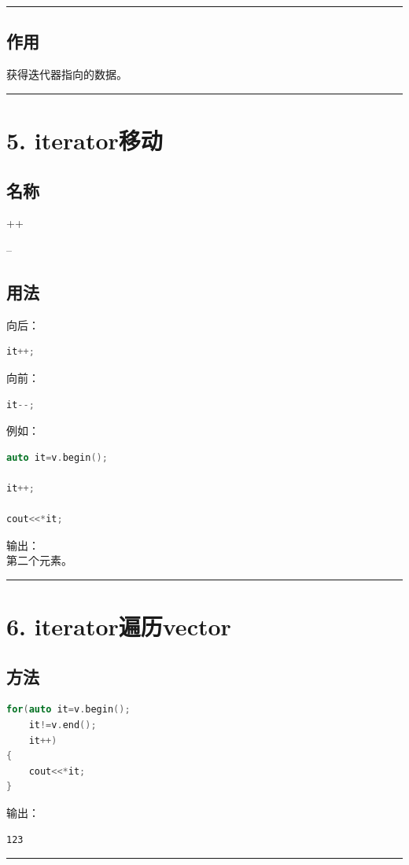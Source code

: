 \documentclass[10pt,twocolumn]{extarticle}
\begin{document}
\noindent\rule{\linewidth}{0.4pt}

\subsection{作用}
获得迭代器指向的数据。

\noindent\rule{\linewidth}{0.4pt}

\section{5. iterator移动}

\subsection{名称}
++

--

\subsection{用法}
向后：
\begin{lstlisting}[language=C++]
it++;
\end{lstlisting}
向前：
\begin{lstlisting}[language=C++]
it--;
\end{lstlisting}
例如：
\begin{lstlisting}[language=C++]
auto it=v.begin();

it++;

cout<<*it;
\end{lstlisting}
输出：\\
第二个元素。

\noindent\rule{\linewidth}{0.4pt}

\section{6. iterator遍历vector}

\subsection{方法}
\begin{lstlisting}[language=C++]
for(auto it=v.begin();
    it!=v.end();
    it++)
{
    cout<<*it;
}
\end{lstlisting}
输出：
\begin{lstlisting}
123
\end{lstlisting}

\noindent\rule{\linewidth}{0.4pt}
\end{document}
